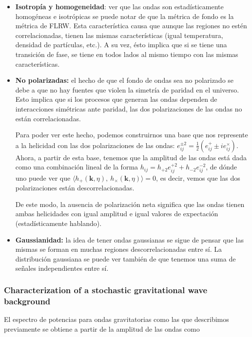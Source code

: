 \begin{itemize}
    \item \textbf{Isotropía y homogeneidad}: ver que las ondas son estadísticamente homogéneas e isotrópicas se puede notar de que la métrica de fondo es la métrica de FLRW. Esta característica causa que aunque las regiones no estén correlacionadas, tienen las mismas características (igual temperatura, densidad de partículas, etc.). A su vez, ésto implica que si se tiene una transición de fase, se tiene en todos lados al mismo tiempo con las mismas características.

    \item \textbf{No polarizadas:} el hecho de que el fondo de ondas sea no polarizado se debe a que no hay fuentes que violen la simetría de paridad en el universo. Esto implica que si los procesos que generan las ondas dependen de interacciones simétricas ante paridad, las dos polarizaciones de las ondas no están correlacionadas.

    Para poder ver este hecho, podemos construirnos una base que nos represente a la helicidad con las dos polarizaciones de las ondas: $e^{\pm 2}_{ij} = \displaystyle \frac{1}{2} \left( e^+_{ij} \pm i e^\times_{ij} \right)$. Ahora, a partir de esta base, tenemos que la amplitud de las ondas está dada como una combinación lineal de la forma $h_{ij} = h_{+2} e^{+2}_{ij} + h_{-2} e^{-2}_{ij}$, de dónde uno puede ver que $\langle h_+ (\textbf{k}, \eta), \ h_\times (\textbf{k}, \eta) \rangle = 0$, es decir, vemos que las dos polarizaciones están descorrelacionadas.

    De este modo, la ausencia de polarización neta significa que las ondas tienen ambas helicidades con igual amplitud e igual valores de expectación (estadísticamente hablando).

    \item \textbf{Gaussianidad:} la idea de tener ondas gaussianas se sigue de pensar que las mismas se forman en muchas regiones descorrelacionadas entre sí. La distribución gaussiana se puede ver también de que tenemos una suma de señales independientes entre sí.
\end{itemize}

\subsubsection{Characterization of a stochastic gravitational wave background}

El espectro de potencias para ondas gravitatorias como las que describimos previamente se obtiene a partir de la amplitud de las ondas como

